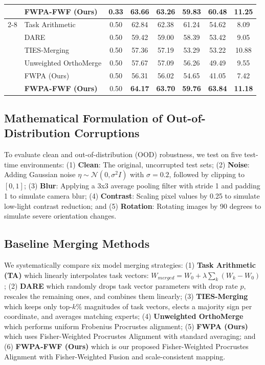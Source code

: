 \documentclass{article}
\theoremstyle{plain}
\theoremstyle{definition}
\theoremstyle{remark}
\begin{document}
\begin{table}[t]
\begin{center}
\begin{scriptsize}
\begin{sc}
\begin{tabular}{llcccccc}
& \textbf{FWPA-FWF (Ours)} & 0.33 & \textbf{63.66} & \textbf{63.26} & \textbf{59.83} & \textbf{60.48} & \textbf{11.25} \\
\cmidrule(r){2-8}
& Task Arithmetic & 0.50 & 62.84 & 62.38 & 61.24 & 54.62 & 8.09 \\
& DARE & 0.50 & 59.42 & 59.00 & 58.39 & 53.42 & 9.05 \\
& TIES-Merging & 0.50 & 57.36 & 57.19 & 53.29 & 53.22 & 10.88 \\
& Unweighted OrthoMerge & 0.50 & 57.67 & 57.09 & 56.26 & 49.49 & 9.55 \\
& FWPA (Ours) & 0.50 & 56.31 & 56.02 & 54.65 & 41.05 & 7.42 \\
& \textbf{FWPA-FWF (Ours)} & 0.50 & \textbf{64.17} & \textbf{63.70} & \textbf{59.76} & \textbf{63.84} & \textbf{11.18} \\
\bottomrule
\end{tabular}
\end{sc}
\end{scriptsize}
\end{center}
\vskip -0.15in
\end{table}

\subsection{Mathematical Formulation of Out-of-Distribution Corruptions}
To evaluate clean and out-of-distribution (OOD) robustness, we test on five test-time environments: (1) \textbf{Clean}: The original, uncorrupted test sets; (2) \textbf{Noise}: Adding Gaussian noise $\eta \sim \mathcal{N}(0, \sigma^2 I)$ with $\sigma=0.2$, followed by clipping to $[0, 1]$; (3) \textbf{Blur}: Applying a 3x3 average pooling filter with stride 1 and padding 1 to simulate camera blur; (4) \textbf{Contrast}: Scaling pixel values by 0.25 to simulate low-light contrast reduction; and (5) \textbf{Rotation}: Rotating images by 90 degrees to simulate severe orientation changes.

\subsection{Baseline Merging Methods}
We systematically compare six model merging strategies: (1) \textbf{Task Arithmetic (TA)} \cite{ilharco22} which linearly interpolates task vectors: $W_{merged} = W_0 + \lambda \sum_k (W_k - W_0)$; (2) \textbf{DARE} \cite{yu23} which randomly drops task vector parameters with drop rate $p$, rescales the remaining ones, and combines them linearly; (3) \textbf{TIES-Merging} \cite{yadav23} which keeps only top-$k\%$ magnitudes of task vectors, elects a majority sign per coordinate, and averages matching experts; (4) \textbf{Unweighted OrthoMerge} \cite{orthomerge} which performs uniform Frobenius Procrustes alignment; (5) \textbf{FWPA (Ours)} which uses Fisher-Weighted Procrustes Alignment with standard averaging; and (6) \textbf{FWPA-FWF (Ours)} which is our proposed Fisher-Weighted Procrustes Alignment with Fisher-Weighted Fusion and scale-consistent mapping.
\end{document}
